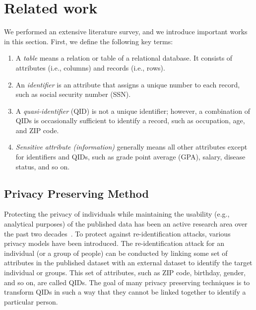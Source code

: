 \section{Related work}
We performed an extensive literature survey, and we introduce important works in this section. First, we define the following key terms:
\begin{enumerate}
\item A \textit{table} means a relation or table of a relational database. It consists of attributes (i.e., columns) and records (i.e., rows).
\item An \textit{identifier} is an attribute that assigns a unique number to each record, such as social security number (SSN).
\item A \textit{quasi-identifier} (QID) is not a unique identifier; however, a combination of QIDs is occasionally sufficient to identify a record, such as occupation, age, and ZIP code.
\item \textit{Sensitive attribute (information)} generally means all other attributes except for identifiers and QIDs, such as grade point average (GPA), salary, disease status, and so on.
\end{enumerate}

\subsection{Privacy Preserving Method}

Protecting the privacy of individuals while maintaining the usability (e.g., analytical purposes) of the published data has been an active research area over the past two decades~\cite{ayala-rivera_systematic_2014}.  To protect against re-identification attacks, various privacy models have been introduced. The re-identification attack for an individual (or a group of people) can be conducted by linking some set of attributes in the published dataset with an external dataset to identify the target individual or groups. This set of attributes, such as ZIP code, birthday, gender, and so on, are called QIDs. The goal of many privacy preserving techniques is to transform QIDs in such a way that they cannot be linked together to identify a particular person.

